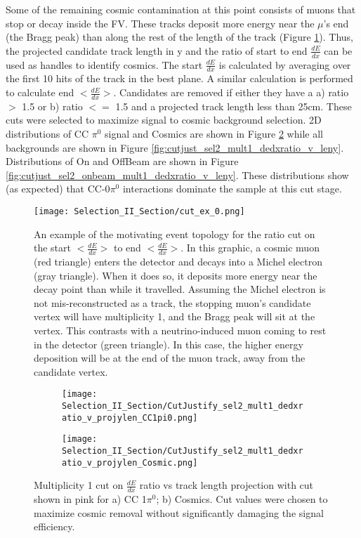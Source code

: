 \par Some of the remaining cosmic contamination at this point consists of muons that stop or decay inside the FV.  These tracks deposit more energy near the $\mu$'s end (the Bragg peak) than along the rest of the length of the track (Figure \ref{fig:cut_ex_0}). Thus, the projected candidate track length in y and the ratio of start to end $\frac{dE}{dx}$ can be used as handles to identify cosmics. The start $\frac{dE}{dx}$ is calculated by averaging over the first 10 hits of the track in the best plane. A similar calculation is performed to calculate end $<\frac{dE}{dx}>$. Candidates are removed if either they have a a) ratio $>$ 1.5 or b) ratio $<=$ 1.5 and a projected track length less than 25cm. These cuts were selected to maximize signal to cosmic background selection. 2D distributions of CC $\pi^0$ signal and Cosmics are shown in Figure \ref{fig:cutjust_sel2_mult1_dedxratio_v_leny_sig} while all backgrounds are shown in Figure \ref{fig:cutjust_sel2_mult1_dedxratio_v_leny}. Distributions of On and OffBeam are shown in Figure \ref{fig:cutjust_sel2_onbeam_mult1_dedxratio_v_leny}. These distributions show (as expected) that CC-0$\pi^0$ interactions dominate the sample at this cut stage.


\begin{figure}[H]
\centering
\texttt{[image: Selection\_II\_Section/cut\_ex\_0.png]}
\caption{An example of the motivating event topology for the ratio cut on the start $<\frac{dE}{dx}>$ to end $<\frac{dE}{dx}>$. In this graphic, a cosmic muon (red triangle) enters the detector and decays into a Michel electron (gray triangle). When it does so, it deposits more energy near the decay point than while it travelled.  Assuming the Michel electron is not mis-reconstructed as a track, the stopping muon’s candidate vertex will have multiplicity 1, and the Bragg peak will sit at the vertex. This contrasts with a neutrino-induced muon coming to rest in the detector (green triangle).  In this case, the higher energy deposition will be at the end of the muon track, away from the candidate vertex. }
\label{fig:cut_ex_0}
\end{figure}

\begin{figure}[H]
\centering
  \begin{subfigure}[t]{0.36\textwidth}
    \centering
\texttt{[image: Selection\_II\_Section/CutJustify\_sel2\_mult1\_dedxratio\_v\_projylen\_CC1pi0.png]}  
  \caption{ }
  \end{subfigure} 
  \hspace{10 mm}
  \begin{subfigure}[t]{0.36\textwidth}
    \centering
\texttt{[image: Selection\_II\_Section/CutJustify\_sel2\_mult1\_dedxratio\_v\_projylen\_Cosmic.png]}
  \caption{ }
  \end{subfigure} 
  \caption{Multiplicity 1 cut on $\frac{dE}{dx}$ ratio vs track length projection with cut shown in pink for a) CC 1$\pi^0$; b) Cosmics. Cut values were chosen to maximize cosmic removal without significantly damaging the signal efficiency.  }
  \label{fig:cutjust_sel2_mult1_dedxratio_v_leny_sig}
  \end{figure}



